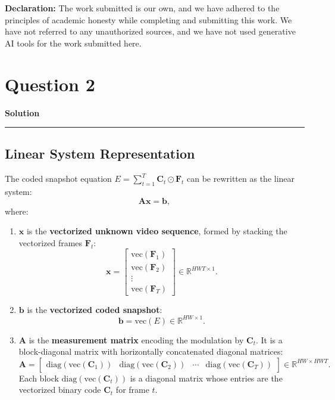 \documentclass[a4paper,12pt]{article}
\title{\cooltitle{CS754 Assignment-3}}
\author{{\bf Saksham Rathi, Ekansh Ravi Shankar, Kshitij Vaidya}}
\date{}
\newenvironment{solution}[2][]{%
    \begin{mdframed}[linecolor=blue!70!black, linewidth=2pt, roundcorner=10pt, backgroundcolor=yellow!10!white, skipabove=12pt, skipbelow=12pt]%
        \textbf{\large #2}
        \par\noindent\rule{\textwidth}{0.4pt}
}{
    \end{mdframed}
}
\begin{document}
\maketitle
\textbf{Declaration:} The work submitted is our own, and
we have adhered to the principles of academic honesty while completing and submitting this work. We have not referred to any unauthorized sources, and we have not used generative AI tools for the work submitted here.

\section*{Question 2}

\begin{solution}{Solution}

  \subsection{Linear System Representation}
  The coded snapshot equation \( E = \sum_{t=1}^T \mathbf{C}_t \odot \mathbf{F}_t \) can be rewritten as the linear system:
  \[
  \mathbf{A} \mathbf{x} = \mathbf{b},
  \]
  where:
  \begin{enumerate}
      \item \(\mathbf{x}\) is the \textbf{vectorized unknown video sequence}, formed by stacking the vectorized frames \(\mathbf{F}_t\):
      \[
      \mathbf{x} = \begin{bmatrix}
      \text{vec}(\mathbf{F}_1) \\
      \text{vec}(\mathbf{F}_2) \\
      \vdots \\
      \text{vec}(\mathbf{F}_T)
      \end{bmatrix} \in \mathbb{R}^{HWT \times 1}.
      \]
      
      \item \(\mathbf{b}\) is the \textbf{vectorized coded snapshot}:
      \[
      \mathbf{b} = \text{vec}(E) \in \mathbb{R}^{HW \times 1}.
      \]
      
      \item \(\mathbf{A}\) is the \textbf{measurement matrix} encoding the modulation by \(\mathbf{C}_t\). It is a block-diagonal matrix with horizontally concatenated diagonal matrices:
      \[
      \mathbf{A} = \begin{bmatrix}
      \text{diag}(\text{vec}(\mathbf{C}_1)) & \text{diag}(\text{vec}(\mathbf{C}_2)) & \cdots & \text{diag}(\text{vec}(\mathbf{C}_T))
      \end{bmatrix} \in \mathbb{R}^{HW \times HWT}.
      \]
      Each block \(\text{diag}(\text{vec}(\mathbf{C}_t))\) is a diagonal matrix whose entries are the vectorized binary code \(\mathbf{C}_t\) for frame \(t\).
  \end{enumerate}

\end{solution}
\end{document}
